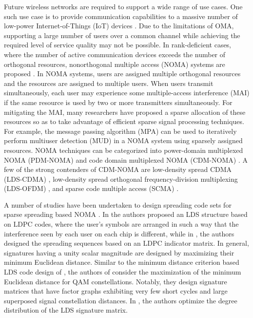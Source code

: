 \documentclass[journal,comsoc]{IEEEtran}
\begin{document}
Future wireless networks are required to support a wide range of use cases. One such use case is to provide communication capabilities to a massive number of low-power Internet-of-Things (IoT) devices \cite{Dai2018}. Due to the limitations of OMA, supporting a large number of users over a common channel while achieving the required level of service quality may not be possible. In rank-deficient cases, where the number of active communication devices exceeds the number of orthogonal resources, nonorthogonal multiple access (NOMA) systems are proposed \cite{Dai2018}. In NOMA systems, users are assigned multiple orthogonal resources and the resources are assigned to multiple users. When users transmit simultaneously, each user may experience some multiple-access interference (MAI) if the same resource is used by two or more transmitters simultaneously. For mitigating the MAI, many researchers have proposed a sparse allocation of these resources so as to take advantage of efficient sparse signal processing techniques. For example, the message passing algorithm (MPA) can be used to iteratively perform multiuser detection (MUD) in a NOMA system using sparsely assigned resources. NOMA techniques can be categorized into power-domain multiplexed NOMA (PDM-NOMA) and code domain multiplexed NOMA (CDM-NOMA) \cite{Dai2018}. A few of the strong contenders of CDM-NOMA are low-density spread CDMA (LDS-CDMA) \cite{Hoshyar2008}, low-density spread orthogonal frequency-division multiplexing (LDS-OFDM) \cite{Razavi2012}, and sparse code multiple access (SCMA) \cite{Nikopour2013}.

A number of studies have been undertaken to design spreading code sets for sparse spreading based NOMA \cite{Hoshyar2006, Song2017, Jiang2019}. In \cite{Hoshyar2006} the authors proposed an LDS structure based on LDPC codes, where the user's symbols are arranged in such a way that the interference seen by each user on each chip is different, while in \cite{JVan2009}, the authors designed the spreading sequences based on an LDPC indicator matrix. In general, signatures having a unity scalar magnitude are designed by maximizing their minimum Euclidean distance. Similar to the minimum distance criterion based LDS code design of \cite{JVan2009}, the authors of \cite{Song2017} consider the maximization of the minimum Euclidean distance for QAM constellations. Notably, they design signature matrices that have factor graphs exhibiting very few short cycles and large superposed signal constellation distances. In \cite{Jiang2019}, the authors optimize the degree distribution of the LDS signature matrix.
\end{document}
